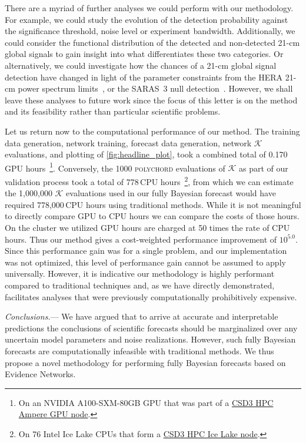 \documentclass[twocolumn,english,aps,prl,amsmath,amssymb,reprint,footinbib,floatfix,showkeys]{revtex4-2}
\newcommand{\br}{\mathcal{K}}
\begin{document}
There are a myriad of further analyses we could perform with our methodology. 
For example, we could study the evolution of the detection probability against the significance threshold, noise level or experiment bandwidth. 
Additionally, we could consider the functional distribution of the detected and non-detected 21-cm global signals to gain insight into what differentiates these two categories.
Or alternatively, we could investigate how the chances of a 21-cm global signal detection have changed in light of the parameter constraints from the HERA 21-cm power spectrum limits~\citep{HERA_theory_22, HERA_obs_23}, or the SARAS~3 null detection~\citep{SARAS3, Bevins_2022}.
However, we shall leave these analyses to future work since the focus of this letter is on the method and its feasibility rather than particular scientific problems. 



Let us return now to the computational performance of our method.
The training data generation, network training,  forecast data generation, network $\br$ evaluations, and plotting of \cref{fig:headline_plot}, took a combined total of 0.170\,GPU hours~\footnote{On an NVIDIA A100-SXM-80GB GPU that was part of a \href{https://docs.hpc.cam.ac.uk/hpc/user-guide/a100.html}{CSD3 HPC Ampere GPU node}.}.
Conversely, the 1000 \textsc{polychord} evaluations of $\br$ as part of our validation process took a total of 778\,CPU hours~\footnote{On 76 Intel Ice Lake CPUs that form a \href{https://docs.hpc.cam.ac.uk/hpc/user-guide/icelake.html}{CSD3 HPC Ice Lake node}.}, from which we can estimate the 1,000,000 $\br$ evaluations used in our fully Bayesian forecast would have required 778,000\,CPU hours using traditional methods. 
While it is not meaningful to directly compare GPU to CPU hours we can compare the costs of those hours.
On the cluster we utilized GPU hours are charged at 50 times the rate of CPU hours. 
Thus our method gives a cost-weighted performance improvement of $10^{5.0}$. 
Since this performance gain was for a single problem, and our implementation was not optimized, this level of performance gain cannot be assumed to apply universally. 
However, it is indicative our methodology is highly performant compared to traditional techniques and, as we have directly demonstrated, facilitates analyses that were previously computationally prohibitively expensive. 


\textit{Conclusions.}---
We have argued that to arrive at accurate and interpretable predictions the conclusions of scientific forecasts should be marginalized over any uncertain model parameters and noise realizations.
However, such fully Bayesian forecasts are computationally infeasible with traditional methods. 
We thus propose a novel methodology for performing fully Bayesian forecasts based on Evidence Networks.
\end{document}
